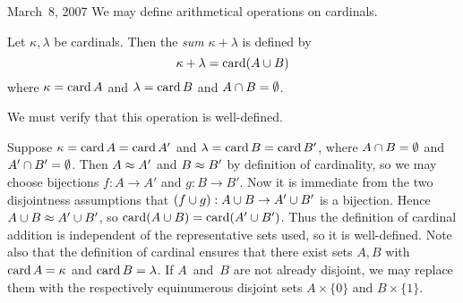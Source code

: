 \begin{lecture}{March~8, 2007}
\noindent We may define arithmetical operations on cardinals.
\begin{defn}
Let \(\kappa,\lambda\) be cardinals. Then the \emph{sum} \(\kappa+\lambda\) is defined by
\[\kappa+\lambda=\operatorname{card}(A\cup B)\]
where \(\kappa=\operatorname{card} A\) and \(\lambda=\operatorname{card} B\) and \(A\cap B=\emptyset\).
\end{defn}
\noindent We must verify that this operation is well-defined.

Suppose \(\kappa=\operatorname{card} A=\operatorname{card} A'\) and \(\lambda=\operatorname{card} B=\operatorname{card} B'\), where \(A\cap B=\emptyset\) and \(A'\cap B'=\emptyset\). Then \(A\approx A'\) and \(B\approx B'\) by definition of cardinality, so we may choose bijections \(f:A\to A'\) and \(g:B\to B'\). Now it is immediate from the two disjointness assumptions that \((f\cup g):A\cup B\to A'\cup B'\) is a bijection. Hence \(A\cup B\approx A'\cup B'\), so \(\operatorname{card}(A\cup B)=\operatorname{card}(A'\cup B')\). Thus the definition of cardinal addition is independent of the representative sets used, so it is well-defined. Note also that the definition of cardinal ensures that there exist sets \(A,B\) with \(\operatorname{card} A=\kappa\) and \(\operatorname{card} B=\lambda\). If \(A\)~and~\(B\) are not already disjoint, we may replace them with the respectively equinumerous disjoint sets \(A\times\{0\}\) and \(B\times\{1\}\).


\end{lecture}
